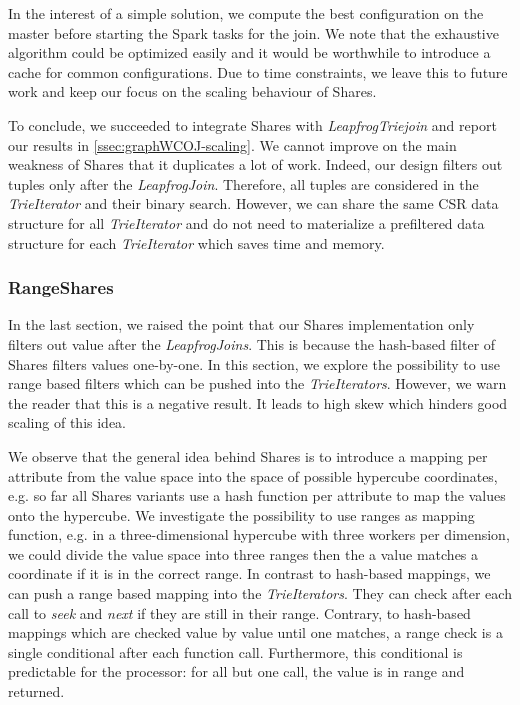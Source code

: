 In the interest of a simple solution, we compute the best configuration on the master before starting the Spark
tasks for the join.
We note that the exhaustive algorithm could be optimized easily and it would be worthwhile to introduce
a cache for common configurations.
Due to time constraints, we leave this to future work and keep our focus on the scaling behaviour of Shares.

To conclude, we succeeded to integrate Shares with \textit{LeapfrogTriejoin} and report our results in \cref{ssec:graphWCOJ-scaling}.
We cannot improve on the main weakness of Shares that it duplicates a lot of work.
Indeed, our design filters out tuples only after the \textit{LeapfrogJoin}.
Therefore, all tuples are considered in the \textit{TrieIterator} and their binary search.
However, we can share the same CSR data structure for all \textit{TrieIterator} and do not
need to materialize a prefiltered data structure for each \textit{TrieIterator} which saves time and memory.

\subsubsection{RangeShares}
In the last section, we raised the point that our Shares implementation only filters out value after the
\textit{LeapfrogJoins}.
This is because the hash-based filter of Shares filters values one-by-one.
In this section, we explore the possibility to use range based filters which can be pushed into the \textit{TrieIterators}.
However, we warn the reader that this is a negative result.
It leads to high skew which hinders good scaling of this idea.

We observe that the general idea behind Shares is to introduce a mapping per attribute from the value space into the space of possible
hypercube coordinates, e.g. so far all Shares variants use a hash function per attribute to map the values onto the hypercube.
We investigate the possibility to use ranges as mapping function, e.g. in a three-dimensional hypercube with three workers per dimension,
we could divide the value space into three ranges then the a value matches a coordinate if it is in the correct range.
In contrast to hash-based mappings, we can push a range based mapping into the \textit{TrieIterators}.
They can check after each call to \textit{seek} and \textit{next} if they are still in their range.
Contrary, to hash-based mappings which are checked value by value until one matches, a range check is a single conditional after each
function call.
Furthermore, this conditional is predictable for the processor: for all but one call, the value is in range and returned.

